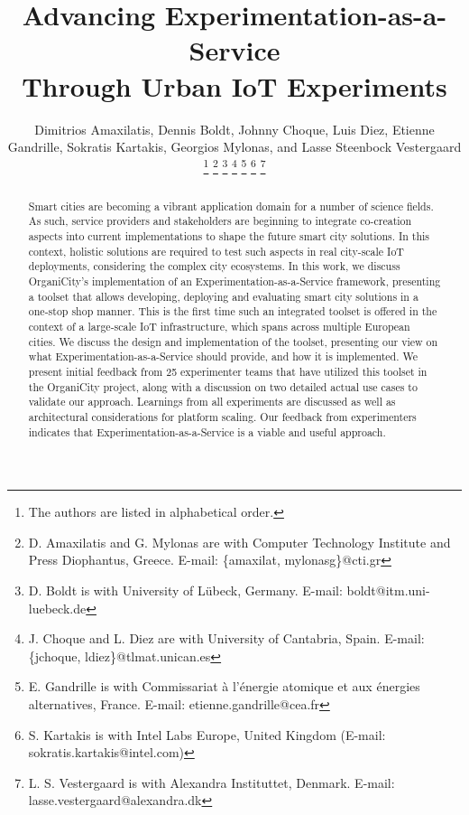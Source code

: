 \documentclass[journal]{IEEEtran}
\begin{document}
\title{Advancing Experimentation-as-a-Service \\Through Urban IoT Experiments}


\author{Dimitrios Amaxilatis,
        Dennis Boldt,
        Johnny Choque,
        Luis Diez, 
        Etienne Gandrille,
        Sokratis Kartakis, 
        Georgios Mylonas, 
        and Lasse Steenbock Vestergaard%
\thanks{The authors are listed in alphabetical order.}
\thanks{D. Amaxilatis and G. Mylonas are with Computer Technology Institute and Press Diophantus, Greece. E-mail:  \{amaxilat, mylonasg\}@cti.gr}%
\thanks{D. Boldt is with University of L\"ubeck, Germany. E-mail: boldt@itm.uni-luebeck.de}%
\thanks{J. Choque and L. Diez are with University of Cantabria, Spain. E-mail: \{jchoque, ldiez\}@tlmat.unican.es}
\thanks{E. Gandrille is with Commissariat \`a l'\'energie atomique et aux \'energies alternatives, France. E-mail: etienne.gandrille@cea.fr}
\thanks{S. Kartakis is with Intel Labs Europe, United Kingdom (E-mail: sokratis.kartakis@intel.com)}
\thanks{L. S. Vestergaard is with Alexandra Instituttet, Denmark. E-mail: lasse.vestergaard@alexandra.dk}%
}

\maketitle

\begin{abstract}
Smart cities are becoming a vibrant application domain for a number of science fields. As such, service providers and stakeholders are beginning to integrate co-creation aspects into current implementations to shape the future smart city solutions. In this context, holistic solutions are required to test such aspects in real city-scale IoT deployments, considering the complex city ecosystems. In this work, we discuss OrganiCity's implementation of an Experimentation-as-a-Service framework, presenting a toolset that allows developing, deploying and evaluating smart city solutions in a one-stop shop manner. This is the first time such an integrated toolset is offered in the context of a large-scale IoT infrastructure, which spans across multiple European cities. We discuss the design and implementation of the toolset, presenting our view on what Experimentation-as-a-Service should provide, and how it is implemented. We present initial feedback from 25 experimenter teams that have utilized this toolset in the OrganiCity project, along with a discussion on two detailed actual use cases to validate our approach. Learnings from all experiments are discussed as well as architectural considerations for platform scaling. Our feedback from experimenters indicates that Experimentation-as-a-Service is a viable and useful approach.
\end{abstract}
\end{document}
